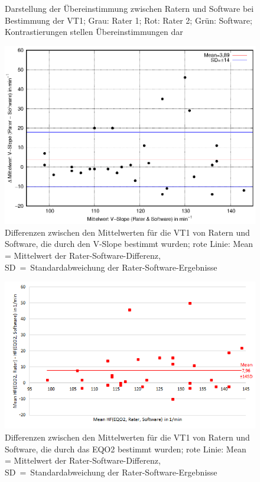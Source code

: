 \begin{figure}[H]
\begin{subfigure}[c]{0.45\textwidth}
			\label{subpic:pic2}
	\end{subfigure}
\caption[Grafische Darstellung der Übereinstimmung für die VT1]{Darstellung der Übereinstimmung zwischen Ratern und Software bei Bestimmung der VT1; Grau: Rater 1; Rot: Rater 2; Grün: Software; Kontrastierungen stellen Übereinstimmungen dar}
\label{pic:pic22}
\end{figure}
%
\begin{figure}[H]
	\centering
	\includegraphics[scale=1]{Bilder/vslope.eps}
	\caption[Differenzen der V-Slope-Ergebnisse zwischen Ratern und Software]{Differenzen zwischen den Mittelwerten für die VT1 von Ratern und Software, die durch den V-Slope bestimmt wurden; rote Linie: Mean = Mittelwert der Rater-Software-Differenz, SD~=~Standardabweichung der Rater-Software-Ergebnisse}
	\label{pic:pic23}
\end{figure}
%
\begin{figure}[H]
	\centering
	\includegraphics[scale=0.7]{Bilder/mean_eqo2}
	\caption[Differenzen der \gls{EQO2}-Ergebnisse zwischen Ratern und Software]{Differenzen zwischen den Mittelwerten für die VT1 von Ratern und Software, die durch das \gls{EQO2} bestimmt wurden; rote Linie: Mean = Mittelwert der Rater-Software-Differenz, SD~=~Standardabweichung der Rater-Software-Ergebnisse}
	\label{pic:pic24}
\end{figure}

